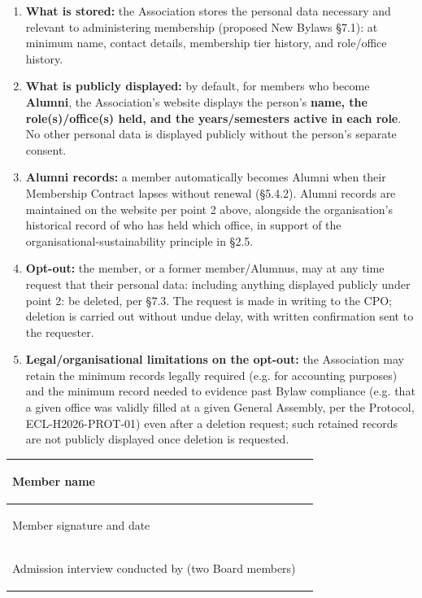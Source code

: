 \documentclass{../../../Common/Latex/Templates/rapport}
\begin{document}
\begin{enumerate}
  \item \textbf{What is stored:} the Association stores the personal data necessary and relevant to administering membership (proposed New Bylaws \S7.1): at minimum name, contact details, membership tier history, and role/office history.
  \item \textbf{What is publicly displayed:} by default, for members who become \textbf{Alumni}, the Association's website displays the person's \textbf{name, the role(s)/office(s) held, and the years/semesters active in each role}. No other personal data is displayed publicly without the person's separate consent.
  \item \textbf{Alumni records:} a member automatically becomes Alumni when their Membership Contract lapses without renewal (\S5.4.2). Alumni records are maintained on the website per point 2 above, alongside the organisation's historical record of who has held which office, in support of the organisational-sustainability principle in \S2.5.
  \item \textbf{Opt-out:} the member, or a former member/Alumnus, may at any time request that their personal data: including anything displayed publicly under point 2: be deleted, per \S7.3. The request is made in writing to the CPO; deletion is carried out without undue delay, with written confirmation sent to the requester.
  \item \textbf{Legal/organisational limitations on the opt-out:} the Association may retain the minimum records legally required (e.g. for accounting purposes) and the minimum record needed to evidence past Bylaw compliance (e.g. that a given office was validly filled at a given General Assembly, per the Protocol, ECL-H2026-PROT-01) even after a deletion request; such retained records are not publicly displayed once deletion is requested.
\end{enumerate}

\begin{tabularx}{\textwidth}{|>{\bfseries\raggedright\arraybackslash}p{5cm}|X|}
  \hline
  Member name                                          & \rule{0pt}{1cm}   \\
  \hline
  Member signature and date                            & \rule{0pt}{1.4cm} \\
  \hline
  Admission interview conducted by (two Board members) & \rule{0pt}{1.4cm} \\
  \hline
\end{tabularx}
\end{document}
